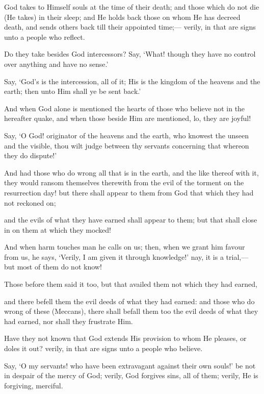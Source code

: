 \documentclass[fontsize=14pt, letterpaper, notitlepage, openany, DIV=12]{scrbook} %
\begin{document}
\noindent[39:42]
God takes to Himself souls at the time of their death; and those which do not die (He
takes) in their sleep; and He holds back those on whom He has decreed death, and sends others
back till their appointed time;--- verily, in that are signs unto a people who reflect.

\noindent[39:43]
Do they take besides God intercessors? Say, `What! though they have no control over
anything and have no sense.'

\noindent[39:44]
Say, `God's is the intercession, all of it; His is the kingdom of the heavens and the earth;
then unto Him shall ye be sent back.'

\noindent[39:45]
And when God alone is mentioned the hearts of those who believe not in the hereafter
quake, and when those beside Him are mentioned, lo, they are joyful!

\noindent[39:46]
Say, `O God! originator of the heavens and the earth, who knowest the unseen and the
visible, thou wilt judge between thy servants concerning that whereon they do dispute!'

\noindent[39:47]
And had those who do wrong all that is in the earth, and the like thereof with it, they
would ransom themselves therewith from the evil of the torment on the resurrection day! but
there shall appear to them from God that which they had not reckoned on;

\noindent[39:48]
and the evils of what they have earned shall appear to them; but that shall close in on
them at which they mocked!

\noindent[39:49]
And when harm touches man he calls on us; then, when we grant him favour from us, he
says, `Verily, I am given it through knowledge!' nay, it is a trial,--- but most of them do not
know!

\noindent[39:50]
Those before them said it too, but that availed them not which they had earned,

\noindent[39:51]
and there befell them the evil deeds of what they had earned: and those who do wrong of
these (Meccans), there shall befall them too the evil deeds of what they had earned, nor shall
they frustrate Him.

\noindent[39:52]
Have they not known that God extends His provision to whom He pleases, or doles it
out? verily, in that are signs unto a people who believe.

\noindent[39:53]
Say, `O my servants! who have been extravagant against their own souls!' be not in
despair of the mercy of God; verily, God forgives sins, all of them; verily, He is forgiving,
merciful.
\end{document}
